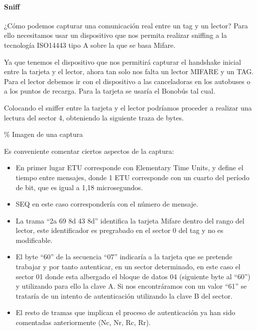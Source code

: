 \paragraph{Sniff}\label{sniff}



¿Cómo podemos capturar una comunicación real entre un tag y un lector?
Para ello necesitamos usar un dispositivo que nos permita realizar
sniffing a la tecnología ISO14443 tipo A sobre la que se basa Mifare.

Ya que tenemos el dispositivo que nos permitirá capturar el handshake
inicial entre la tarjeta y el lector, ahora tan solo nos falta un lector
MIFARE y un TAG. Para el lector debemos ir con el dispositivo a las
canceladoras en los autobuses o a los puntos de recarga. Para la tarjeta
se usaría el Bonobús tal cual.

Colocando el sniffer entre la tarjeta y el lector podríamos proceder a
realizar una lectura del sector 4, obteniendo la siguiente traza de
bytes.

\% Imagen de una captura

Es conveniente comentar ciertos aspectos de la captura:

\begin{itemize}
\itemsep1pt\parskip0pt
\item
  En primer lugar ETU corresponde con Elementary Time Units, y define el
  tiempo entre mensajes, donde 1 ETU corresponde con un cuarto del
  período de bit, que es igual a 1,18 microsegundos.
\item
  SEQ en este caso correspondería con el número de mensaje.
\item
  La trama ``2a 69 8d 43 8d'' identifica la tarjeta Mifare dentro del
  rango del lector, este identificador es pregrabado en el sector 0 del
  tag y no es modificable.
\item
  El byte ``60'' de la secuencia ``07'' indicaría a la tarjeta que se
  pretende trabajar y por tanto autenticar, en un sector determinado, en
  este caso el sector 01 donde esta albergado el bloque de datos 04
  (siguiente byte al ``60'') y utilizando para ello la clave A. Si nos
  encontráramos con un valor ``61'' se trataría de un intento de
  autenticación utilizando la clave B del sector.
\item
  El resto de tramas que implican el proceso de autenticación ya han
  sido comentadas anteriormente (Nc, Nr, Rc, Rr).
\end{itemize}

